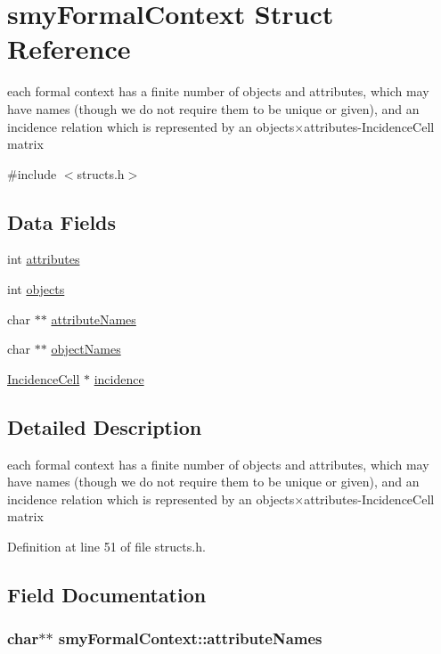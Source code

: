 \hypertarget{structsmyFormalContext}{\section{smy\-Formal\-Context \-Struct \-Reference}
\label{structsmyFormalContext}
}


each formal context has a finite number of objects and attributes, which may have names (though we do not require them to be unique or given), and an incidence relation which is represented by an objects×attributes-\/\-Incidence\-Cell matrix  




{\ttfamily \#include $<$structs.\-h$>$}

\subsection*{\-Data \-Fields}
\begin{DoxyCompactItemize}
\item 
int \hyperlink{structsmyFormalContext_a4ae89e8f42fd7feab4db872cd8472b5e}{attributes}
\item 
int \hyperlink{structsmyFormalContext_ab6e220297887bc2af0e612c94132ceb3}{objects}
\item 
char $\ast$$\ast$ \hyperlink{structsmyFormalContext_a731e638aa85ebc11076f9e17ada14c29}{attribute\-Names}
\item 
char $\ast$$\ast$ \hyperlink{structsmyFormalContext_a732a2615921f2d209fb7d9341df2c183}{object\-Names}
\item 
\hyperlink{easy_8h_a92fa84ef7a12663bb998f141ab729056}{\-Incidence\-Cell} $\ast$ \hyperlink{structsmyFormalContext_a55d9d4c2e38c3571e9f6e870bc1c06b8}{incidence}
\end{DoxyCompactItemize}


\subsection{\-Detailed \-Description}
each formal context has a finite number of objects and attributes, which may have names (though we do not require them to be unique or given), and an incidence relation which is represented by an objects×attributes-\/\-Incidence\-Cell matrix 

\-Definition at line 51 of file structs.\-h.



\subsection{\-Field \-Documentation}
\hypertarget{structsmyFormalContext_a731e638aa85ebc11076f9e17ada14c29}{
\subsubsection[{attribute\-Names}]{\setlength{\rightskip}{0pt plus 5cm}char$\ast$$\ast$ {\bf smy\-Formal\-Context\-::attribute\-Names}}}\label{structsmyFormalContext_a731e638aa85ebc11076f9e17ada14c29}


